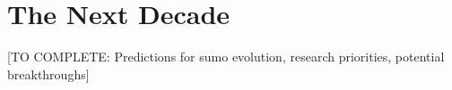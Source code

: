 \section{The Next Decade}

[TO COMPLETE: Predictions for sumo evolution, research priorities, potential breakthroughs]
